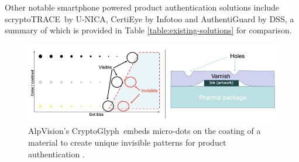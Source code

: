 \documentclass[thesis.tex]{subfiles}
\begin{document}
Other notable smartphone powered product authentication solutions include scryptoTRACE\textregistered\ by U-NICA, CertiEye by Infotoo and AuthentiGuard by DSS, a summary of which is provided in Table \ref{table:existing-solutions} for comparison.

\begin{figure}
\centering \includegraphics[width=\textwidth]{images/existing_solutions/cryptoglyph}
\vspace{-8mm}
\caption{AlpVision's CryptoGlyph\textregistered\ embeds micro-dots on the coating of a material to create unique invisible patterns for product authentication \cite{alpvision}. \label{figure:alpvision}}
\vspace{-5mm}
\end{figure}
\end{document}
